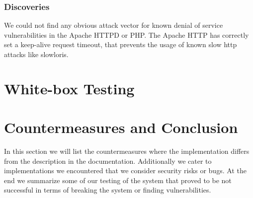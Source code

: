 \documentclass{article}
\begin{document}
\subsubsection{Discoveries}
We could not find any obvious attack vector for known denial of service vulnerabilities in the Apache HTTPD or PHP. The Apache HTTP has correctly set a keep-alive request timeout, that prevents the usage of known slow http attacks like slowloris.

\section{White-box Testing}


\section{Countermeasures and Conclusion}
In this section we will list the countermeasures where the implementation differs from the description in the documentation. Additionally we cater to implementations we encountered that we consider security risks or bugs. At the end we summarize some of our testing of the system that proved to be not successful in terms of breaking the system or finding vulnerabilities.
\end{document}
